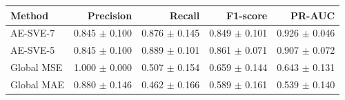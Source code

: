 \begin{tabular}{lrrrr}
\toprule
Method & Precision & Recall & F1-score & PR-AUC \\
\midrule
AE-SVE-7 & 0.845 $\pm$ 0.100 & 0.876 $\pm$ 0.145 & 0.849 $\pm$ 0.101 & 0.926 $\pm$ 0.046 \\
AE-SVE-5 & 0.845 $\pm$ 0.100 & 0.889 $\pm$ 0.101 & 0.861 $\pm$ 0.071 & 0.907 $\pm$ 0.072 \\
Global MSE & 1.000 $\pm$ 0.000 & 0.507 $\pm$ 0.154 & 0.659 $\pm$ 0.144 & 0.643 $\pm$ 0.131 \\
Global MAE & 0.880 $\pm$ 0.146 & 0.462 $\pm$ 0.166 & 0.589 $\pm$ 0.161 & 0.539 $\pm$ 0.140 \\
\bottomrule
\end{tabular}